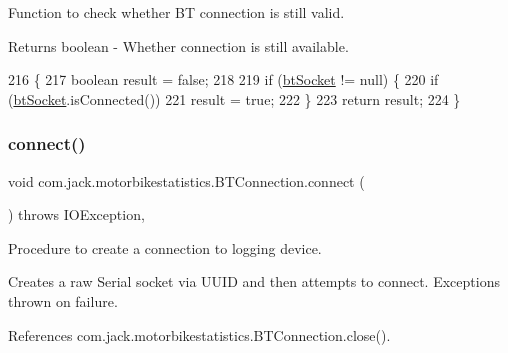 Function to check whether BT connection is still valid. 

\begin{DoxyReturn}{Returns}
boolean -\/ Whether connection is still available. 
\end{DoxyReturn}

\begin{DoxyCode}
216                                  \{
217         \textcolor{keywordtype}{boolean} result = \textcolor{keyword}{false};
218 
219         \textcolor{keywordflow}{if} (\hyperlink{classcom_1_1jack_1_1motorbikestatistics_1_1_b_t_connection_a0d47f94a35f7c8a07429975446e7b33b}{btSocket} != null) \{
220             \textcolor{keywordflow}{if} (\hyperlink{classcom_1_1jack_1_1motorbikestatistics_1_1_b_t_connection_a0d47f94a35f7c8a07429975446e7b33b}{btSocket}.isConnected())
221                 result = \textcolor{keyword}{true};
222         \}
223         \textcolor{keywordflow}{return} result;
224     \}
\end{DoxyCode}
\mbox{\label{classcom_1_1jack_1_1motorbikestatistics_1_1_b_t_connection_a4c1b8ebff8a40a9cddd77a55b59b45af}} 
\subsubsection{\texorpdfstring{connect()}{connect()}}
{\footnotesize\ttfamily void com.\+jack.\+motorbikestatistics.\+B\+T\+Connection.\+connect (\begin{DoxyParamCaption}{ }\end{DoxyParamCaption}) throws I\+O\+Exception\hspace{0.3cm}{\ttfamily [inline]}, {\ttfamily [private]}}



Procedure to create a connection to logging device. 

Creates a raw Serial socket via U\+U\+ID and then attempts to connect. Exceptions thrown on failure. 

References com.\+jack.\+motorbikestatistics.\+B\+T\+Connection.\+close().


